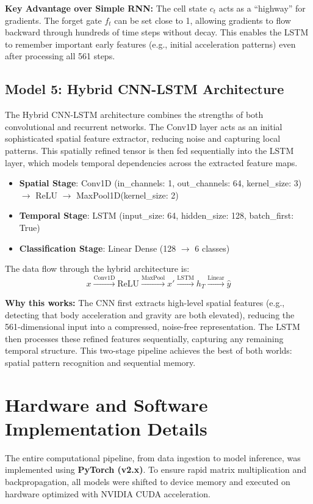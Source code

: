 \documentclass[12pt,a4paper]{article}
\begin{document}
\textbf{Key Advantage over Simple RNN:} The cell state $c_t$ acts as a ``highway'' for gradients. The forget gate $f_t$ can be set close to 1, allowing gradients to flow backward through hundreds of time steps without decay. This enables the LSTM to remember important early features (e.g., initial acceleration patterns) even after processing all 561 steps.

\subsection{Model 5: Hybrid CNN-LSTM Architecture}
The Hybrid CNN-LSTM architecture combines the strengths of both convolutional and recurrent networks. The Conv1D layer acts as an initial sophisticated spatial feature extractor, reducing noise and capturing local patterns. This spatially refined tensor is then fed sequentially into the LSTM layer, which models temporal dependencies across the extracted feature maps.
\begin{itemize}
    \item \textbf{Spatial Stage}: Conv1D (in\_channels: 1, out\_channels: 64, kernel\_size: 3) $\rightarrow$ ReLU $\rightarrow$ MaxPool1D(kernel\_size: 2)
    \item \textbf{Temporal Stage}: LSTM (input\_size: 64, hidden\_size: 128, batch\_first: True)
    \item \textbf{Classification Stage}: Linear Dense (128 $\rightarrow$ 6 classes)
\end{itemize}

The data flow through the hybrid architecture is:
\[ x \xrightarrow{\text{Conv1D}} \text{ReLU} \xrightarrow{\text{MaxPool}} x' \xrightarrow{\text{LSTM}} h_T \xrightarrow{\text{Linear}} \hat{y} \]

\textbf{Why this works:} The CNN first extracts high-level spatial features (e.g., detecting that body acceleration and gravity are both elevated), reducing the 561-dimensional input into a compressed, noise-free representation. The LSTM then processes these refined features sequentially, capturing any remaining temporal structure. This two-stage pipeline achieves the best of both worlds: spatial pattern recognition and sequential memory.

\newpage
\section{Hardware and Software Implementation Details}
The entire computational pipeline, from data ingestion to model inference, was implemented using \textbf{PyTorch (v2.x)}. To ensure rapid matrix multiplication and backpropagation, all models were shifted to device memory and executed on hardware optimized with NVIDIA CUDA acceleration.
\end{document}
